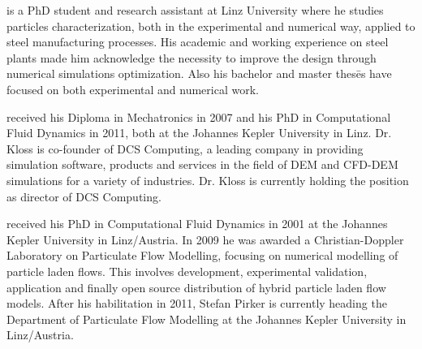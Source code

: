  is a PhD student and research assistant at Linz University where he studies particles characterization, 
both in the experimental and numerical way, 
applied to steel manufacturing processes. His academic and working experience on steel plants made him 
acknowledge the necessity to improve the design through numerical simulations 
optimization. Also his bachelor and master thes\={e}s have focused on both experimental and numerical work.

\vspace{2cm}

 received his Diploma in Mechatronics in 2007 and his PhD in Computational Fluid Dynamics in 2011, 
both at the Johannes Kepler University in Linz. 
Dr. Kloss is co-founder of DCS Computing, a leading
company in providing simulation software, products and services in the field of DEM and CFD-DEM 
simulations for a variety of industries. Dr. Kloss is currently holding the position as director of DCS Computing.

\vspace{2cm}

 received his PhD in Computational Fluid Dynamics in 2001 at the Johannes Kepler University in Linz/Austria. 
In 2009 he was awarded a Christian-Doppler Laboratory on Particulate Flow Modelling, focusing on numerical modelling of particle laden flows. 
This involves development, experimental validation, application and finally open source distribution of hybrid particle laden flow models. 
After his habilitation in 2011, Stefan Pirker is currently heading the Department of Particulate Flow Modelling at the Johannes 
Kepler University in Linz/Austria.
